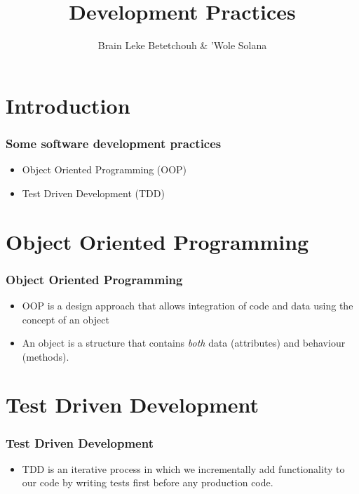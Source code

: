 \documentclass[10pt,t,xcolor=dvipsnames]{beamer}
\title{ Development Practices }
\author{ Brain Leke Betetchouh \& 'Wole Solana }
\begin{document}
\frame [c, plain]{\titlepage}
\section{Introduction}
\begin{frame}
\frametitle{Some software development practices}
\pause
\begin{itemize}[<+->]
\item Object Oriented Programming (OOP)
\item Test Driven Development (TDD)
\end{itemize}
\end{frame}
\section{Object Oriented Programming}
\begin{frame}[fragile]
\frametitle{Object Oriented Programming}
\pause
\begin{itemize}[<+->]
\item OOP is a design approach that allows integration of code and data using the concept of an \alert{object}
\item An \alert{object} is a structure that contains \textit{both} data (attributes) and behaviour (methods).
\end{itemize}
\end{frame}
\section{Test Driven Development}
\begin{frame}[fragile]
\frametitle{Test Driven Development}
\pause
\begin{itemize}[<+->]
\item TDD is an \alert{iterative} process in which we \alert{incrementally} add functionality to our code by \alert{writing tests first} before any production code.
\end{itemize}
\end{frame}
\end{document}
